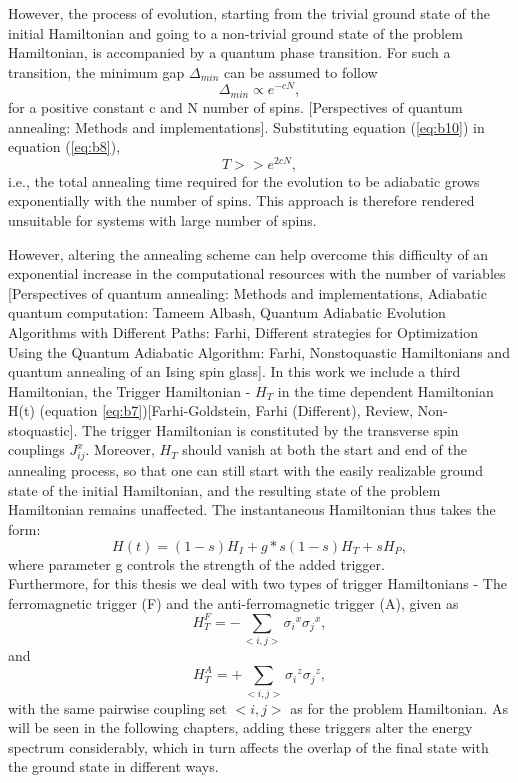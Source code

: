 \documentclass[../main.tex]{subfiles}
\begin{document}
However, the process of evolution, starting from the trivial ground state of the initial Hamiltonian and going to a non-trivial ground state of the problem Hamiltonian, is accompanied by a quantum phase transition. For such a transition, the minimum gap $\Delta_{min}$ can be assumed to follow
\begin{equation}
\Delta_{min} \propto e^{-cN}, \label{eq:b10}
\end{equation}
for a positive constant c and N number of spins. [Perspectives of quantum annealing: Methods and implementations]. Substituting equation (\ref{eq:b10}) in equation (\ref{eq:b8}),
\begin{equation}
 T>> e^{2cN}, \label{eq:b11}
\end{equation}
i.e., the total annealing time required for the evolution to be adiabatic grows exponentially with the number of spins. This approach is therefore rendered unsuitable for systems with large number of spins.

However, altering the annealing scheme can help overcome this difficulty of an exponential increase in the computational resources with the number of variables [Perspectives of quantum annealing: Methods and implementations, Adiabatic quantum computation: Tameem Albash, Quantum Adiabatic Evolution Algorithms with Different Paths: Farhi, Different strategies for Optimization Using the Quantum Adiabatic Algorithm: Farhi, Nonstoquastic Hamiltonians and quantum annealing of an Ising spin glass]. In this work we include a third Hamiltonian, the Trigger Hamiltonian - $H_T$ in the time dependent Hamiltonian H(t) (equation \ref{eq:b7})[Farhi-Goldstein, Farhi (Different), Review, Non-stoquastic]. The trigger Hamiltonian is constituted by the transverse spin couplings $J_{ij}^x$. Moreover, $H_T$ should vanish at both the start and end of the annealing process, so that one can still start with the easily realizable ground state of the initial Hamiltonian, and the resulting state of the problem Hamiltonian remains unaffected. The instantaneous Hamiltonian thus takes the form: 
\begin{equation}
H(t)= (1-s)H_I + g*s(1-s)H_T + sH_P ,\label{eq:b12}
\end{equation} 
where parameter g controls the strength of the added trigger.\\
Furthermore, for this thesis we deal with two types of trigger Hamiltonians - The ferromagnetic trigger (F) and the anti-ferromagnetic trigger (A), given as
\begin{equation}
H_T^F = - \sum\limits_{<i,j>}{\sigma_i}^x{\sigma_j}^x,    \label{eq:b13}
\end{equation}
and
\begin{equation}
H_T^A= +\sum\limits_{<i,j>}{\sigma_i}^z{\sigma_j}^z,          \label{eq:b14}
\end{equation}
with the same pairwise coupling set $<i,j>$ as for the problem Hamiltonian.
As will be seen in the following chapters, adding these triggers alter the energy spectrum considerably, which in turn affects the overlap of the final state with the ground state in different ways. \\
\end{document}
